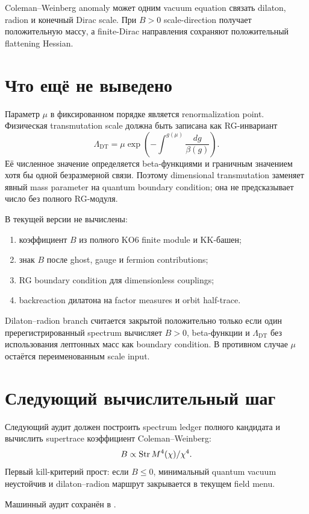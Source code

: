 \begin{proposition}
Coleman--Weinberg anomaly может одним vacuum equation связать dilaton,
radion и конечный Dirac scale. При \(B>0\) scale-direction получает
положительную массу, а finite-Dirac направления сохраняют положительный
flattening Hessian.
\end{proposition}

\section{Что ещё не выведено}

Параметр \(\mu\) в фиксированном порядке является renormalization point.
Физическая transmutation scale должна быть записана как RG-инвариант
\begin{equation}
 \Lambda_{\mathrm{DT}}
 =
 \mu
 \exp\left(
 -\int^{g(\mu)}
 \frac{dg}{\beta(g)}
 \right).
\end{equation}
Её численное значение определяется beta-функциями и граничным значением
хотя бы одной безразмерной связи. Поэтому dimensional transmutation
заменяет явный mass parameter на quantum boundary condition; она не
предсказывает число без полного RG-модуля.

В текущей версии не вычислены:
\begin{enumerate}
 \item коэффициент \(B\) из полного KO6 finite module и KK-башен;
 \item знак \(B\) после ghost, gauge и fermion contributions;
 \item RG boundary condition для dimensionless couplings;
 \item backreaction дилатона на factor measures и orbit half-trace.
\end{enumerate}

\begin{nogocriterion}
Dilaton--radion branch считается закрытой положительно только если один
пререгистрированный spectrum вычисляет \(B>0\), beta-функции и
\(\Lambda_{\mathrm{DT}}\) без использования лептонных масс как boundary
condition. В противном случае \(\mu\) остаётся переименованным scale input.
\end{nogocriterion}

\section{Следующий вычислительный шаг}

Следующий аудит должен построить spectrum ledger полного кандидата и
вычислить supertrace коэффициент Coleman--Weinberg:
\begin{equation}
 B\propto
 \operatorname{Str} M^4(\chi)/\chi^4.
\end{equation}
Первый kill-критерий прост: если \(B\le0\), минимальный quantum vacuum
неустойчив и dilaton--radion маршрут закрывается в текущем field menu.

Машинный аудит сохранён в
.